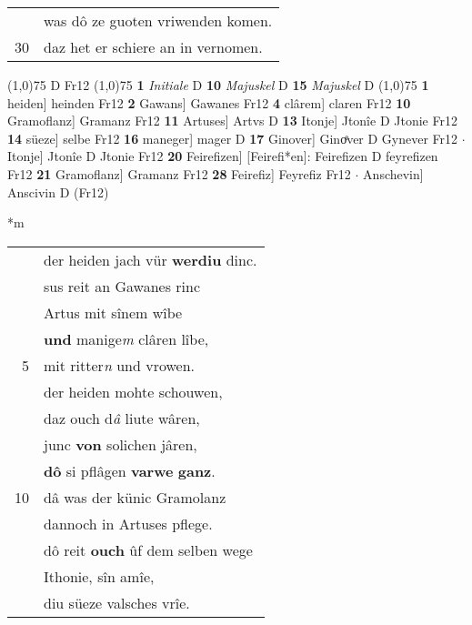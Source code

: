 \documentclass[8pt,a4paper,notitlepage]{article}
\begin{document}
\begin{table}[ht]
\begin{minipage}[t]{0.5\linewidth}
\begin{tabular}{rl}
 & was dô ze guoten vriwenden komen.\\ 
30 & daz het er schiere an in vernomen.\\ 
\end{tabular}
\scriptsize
\line(1,0){75} \newline
D Fr12 \newline
\line(1,0){75} \newline
\textbf{1} \textit{Initiale} D  \textbf{10} \textit{Majuskel} D  \textbf{15} \textit{Majuskel} D  \newline
\line(1,0){75} \newline
\textbf{1} heiden] heinden Fr12 \textbf{2} Gawans] Gawanes Fr12 \textbf{4} clârem] claren Fr12 \textbf{10} Gramoflanz] Gramanz Fr12 \textbf{11} Artuses] Artvs D \textbf{13} Itonje] Jtonîe D Jtonie Fr12 \textbf{14} süeze] selbe Fr12 \textbf{16} maneger] mager D \textbf{17} Ginover] Ginoͤver D Gynever Fr12  $\cdot$ Itonje] Jtonîe D Jtonie Fr12 \textbf{20} Feirefizen] [Feirefi*en]: Feirefizen D feyrefizen Fr12 \textbf{21} Gramoflanz] Gramanz Fr12 \textbf{28} Feirefiz] Feyrefiz Fr12  $\cdot$ Anschevin] Anscivin D (Fr12) \newline
\end{minipage}
\hspace{0.5cm}
\begin{minipage}[t]{0.5\linewidth}
\small
\begin{center}*m
\end{center}
\begin{tabular}{rl}
 & der heiden jach vür \textbf{werdiu} dinc.\\ 
 & sus reit an Gawanes rinc\\ 
 & Artus mit sînem wîbe\\ 
 & \textbf{und} manige\textit{m} clâren lîbe,\\ 
5 & mit ritter\textit{n} und vrowen.\\ 
 & der heiden mohte schouwen,\\ 
 & daz ouch d\textit{â} liute wâren,\\ 
 & junc \textbf{von} solichen jâren,\\ 
 & \textbf{dô} si pflâgen \textbf{varwe} \textbf{ganz}.\\ 
10 & dâ was der künic Gramolanz\\ 
 & dannoch in Artuses pflege.\\ 
 & dô reit \textbf{ouch} ûf dem selben wege\\ 
 & Ithonie, sîn amîe,\\ 
 & diu süeze valsches vrîe.\\ 

\end{tabular}
\end{minipage}
\end{table}
\end{document}
